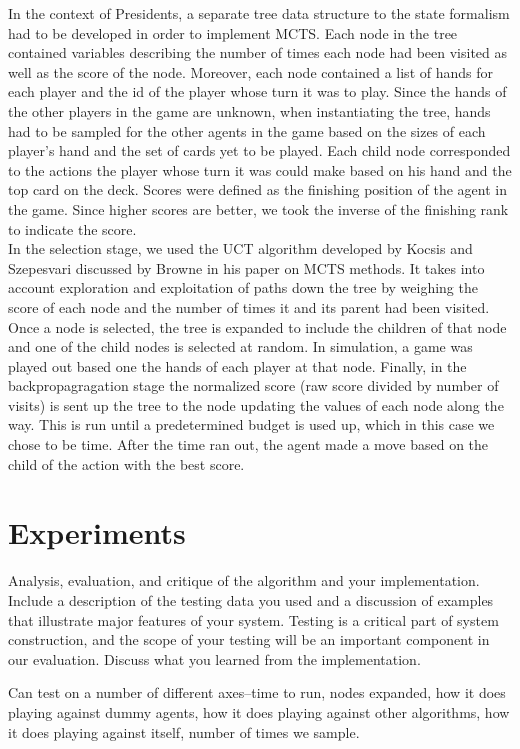 \documentclass[11pt]{article}
\begin{document}
In the context of Presidents, a separate tree data structure to the state formalism had to be developed in order to implement MCTS. Each node in the tree contained variables describing the number of times each node had been visited as well as the score of the node. Moreover, each node contained a list of hands for each player and the id of the player whose turn it was to play. Since the hands of the other players in the game are unknown, when instantiating the tree, hands had to be sampled for the other agents in the game based on the sizes of each player's hand and the set of cards yet to be played. Each child node corresponded to the actions the player whose turn it was could make based on his hand and the top card on the deck. Scores were defined as the finishing position of the agent in the game. Since higher scores are better, we took the inverse of the finishing rank to indicate the score.\\

In the selection stage, we used the UCT algorithm developed by Kocsis and Szepesvari discussed by Browne in his paper on MCTS methods. It takes into account exploration and exploitation of paths down the tree by weighing the score of each node and the number of times it and its parent had been visited. Once a node is selected, the tree is expanded to include the children of that node and one of the child nodes is selected at random. In simulation, a game was played out based one the hands of each player at that node. Finally, in the backpropagragation stage the normalized score (raw score divided by number of visits) is sent up the tree to the node updating the values of each node along the way. This is run until a predetermined budget is used up, which in this case we chose to be time. After the time ran out, the agent made a move based on the child of the action with the best score.



\section{Experiments}
Analysis, evaluation, and critique of the algorithm and your
implementation. Include a description of the testing data you used and
a discussion of examples that illustrate major features of your
system. Testing is a critical part of system construction, and the
scope of your testing will be an important component in our
evaluation. Discuss what you learned from the implementation.

Can test on a number of different axes--time to run, nodes expanded, how it does playing against dummy agents, how it does playing against other algorithms, how it does playing against itself, number of times we sample.
\end{document}
